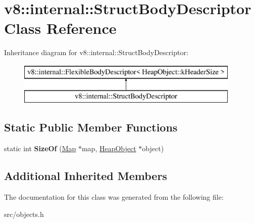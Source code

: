 \hypertarget{classv8_1_1internal_1_1_struct_body_descriptor}{}\section{v8\+:\+:internal\+:\+:Struct\+Body\+Descriptor Class Reference}
\label{classv8_1_1internal_1_1_struct_body_descriptor}
Inheritance diagram for v8\+:\+:internal\+:\+:Struct\+Body\+Descriptor\+:\begin{figure}[H]
\begin{center}
\leavevmode
\includegraphics[height=2.000000cm]{classv8_1_1internal_1_1_struct_body_descriptor}
\end{center}
\end{figure}
\subsection*{Static Public Member Functions}
\begin{DoxyCompactItemize}
\item 
\hypertarget{classv8_1_1internal_1_1_struct_body_descriptor_ab42a6fbe3735acb940678529b7253339}{}static int {\bfseries Size\+Of} (\hyperlink{classv8_1_1internal_1_1_map}{Map} $\ast$map, \hyperlink{classv8_1_1internal_1_1_heap_object}{Heap\+Object} $\ast$object)\label{classv8_1_1internal_1_1_struct_body_descriptor_ab42a6fbe3735acb940678529b7253339}

\end{DoxyCompactItemize}
\subsection*{Additional Inherited Members}


The documentation for this class was generated from the following file\+:\begin{DoxyCompactItemize}
\item 
src/objects.\+h\end{DoxyCompactItemize}
